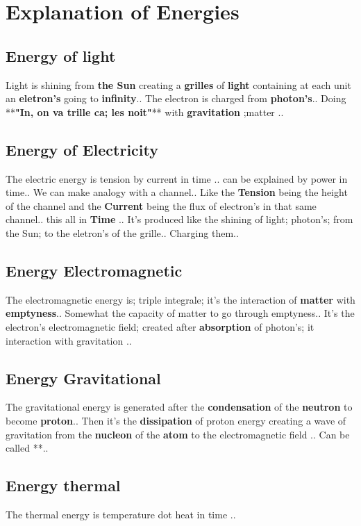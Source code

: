 \documentclass[12pt, letterpaper]{article}
\begin{document}
	\chapter{Explanation of Energies}
	\section{Energy of light}
	Light is shining from \textbf{the Sun} creating a \textbf{grilles} of \textbf{light} containing at each unit an \textbf{eletron's} going to \textbf{infinity}.. The electron is charged from \textbf{photon's}.. Doing **\textbf{"In, on va trille ca; les noit"}** with \textbf{gravitation} ;matter ..
	
	\section{Energy of Electricity}
	The electric energy is tension by current in time .. can be explained by power in time..
	We can make analogy with a channel.. Like the \textbf{Tension} being the height of the channel and the \textbf{Current} being the flux of electron's in that same channel.. this all in \textbf{Time} .. It's produced like the shining of light; photon's; from the Sun; to the eletron's of the grille.. Charging them..
	
	
	\section{Energy Electromagnetic}
	The electromagnetic energy  is; triple integrale; it's the interaction of \textbf{matter} with \textbf{emptyness}.. Somewhat the capacity of matter to go through emptyness.. It's the electron's electromagnetic field; created after \textbf{absorption} of photon's; it interaction with gravitation ..
	
	
	\section{Energy Gravitational}
	The gravitational energy is generated after the \textbf{condensation} of the \textbf{neutron} to become \textbf{proton}.. Then it's the \textbf{dissipation} of proton energy creating a wave of gravitation from the \textbf{nucleon} of the \textbf{atom} to the electromagnetic field .. Can be called **..
	
	\section{Energy thermal}
	The thermal energy is temperature dot heat in time .. 
	\newline\newline
	
\end{document}
